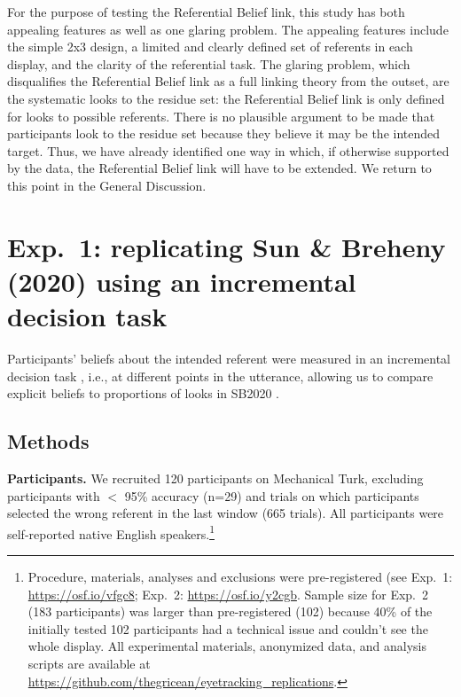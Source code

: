 \documentclass[10pt,letterpaper]{article}
\begin{document}
For the purpose of testing the Referential Belief link, this study has both appealing features as well as one glaring problem. The appealing features include the simple 2x3 design, a limited and clearly defined set of referents in each display, and the clarity of the referential task. The glaring problem, which disqualifies the Referential Belief link as a full linking theory from the outset, are the systematic looks to the residue set: the Referential Belief link is only defined for looks to possible referents. There is no plausible argument to be made that participants look to the residue set because they believe it may be the intended target.  Thus, we have already identified one way in which, if otherwise supported by the data, the Referential Belief link will have to be extended. We return to this point in the General Discussion.


\section{Exp.~1: replicating Sun \& Breheny (2020) using an incremental decision task}

Participants' beliefs about the intended referent were measured in  an incremental decision task \cite{Allopenna1998,QingLD2018, KreissDegen2020,alsop2018}, i.e., at different points in the utterance, allowing us to compare explicit beliefs to proportions of looks in SB2020 . 

\subsection{Methods}

\textbf{Participants.} We recruited 120 participants on Mechanical Turk, excluding participants with $<$ 95\% accuracy (n=29) and trials on which participants selected the wrong referent in the last window (665 trials). All participants were self-reported native English speakers.\footnote{Procedure, materials, analyses and exclusions were pre-registered (see Exp.~1: \url{https://osf.io/vfgc8}; Exp.~2: \url{https://osf.io/y2cgb}. Sample size for Exp.~2 (183 participants) was larger than pre-registered (102) because 40\% of the initially tested 102 participants had a technical issue and couldn't see the whole display. All experimental materials, anonymized data, and analysis scripts are available at \url{https://github.com/thegricean/eyetracking_replications}.}
\end{document}
